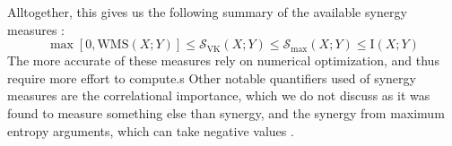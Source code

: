 \documentclass[../main.tex]{subfiles}
\begin{document}

Alltogether, this gives us the following summary of the available synergy measures \cite{griffith2014quantifying}:
%
\begin{equation}
\max [0,\mathrm{WMS}(X;Y)] \le \mathcal{S}_\mathrm{VK} (X;Y) \le \mathcal{S}_\mathrm{max} (X;Y) \le \mathrm{I}(X;Y)
\end{equation}
%
The more accurate of these measures rely on numerical optimization, and thus require more effort to compute.s
Other notable quantifiers used of synergy measures are the correlational importance, which we do not discuss as it was found to measure something else than synergy, and the synergy from maximum entropy arguments, which can take negative values \cite{griffith2014quantifying, olbrich2015information}.
\end{document}
